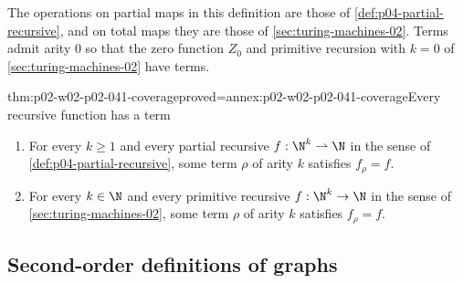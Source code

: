 The operations on partial maps in this definition are those of
\cref{def:p04-partial-recursive}, and on total maps they are those of
\cref{sec:turing-machines-02}.  Terms admit arity \(0\) so that the zero
function \(Z_0\) and primitive recursion with \(k=0\) of
\cref{sec:turing-machines-02} have terms.

\begin{hblemma}{thm:p02-w02-p02-041-coverage}{proved=annex:p02-w02-p02-041-coverage}{Every recursive function has a term}
\begin{enumerate}
 \item[(a)] For every \(k\ge1\) and every partial recursive
   \(f:\N^k\rightharpoonup\N\) in the sense of
   \cref{def:p04-partial-recursive}, some term \(\rho\) of arity \(k\)
   satisfies \(f_\rho=f\).
 \item[(b)] For every \(k\in\N\) and every primitive recursive
   \(f:\N^k\to\N\) in the sense of \cref{sec:turing-machines-02}, some term
   \(\rho\) of arity \(k\) satisfies \(f_\rho=f\).
\end{enumerate}
\end{hblemma}

\subsection{Second-order definitions of graphs}
\label{sec:p02-w02-p02-041-graphs}

